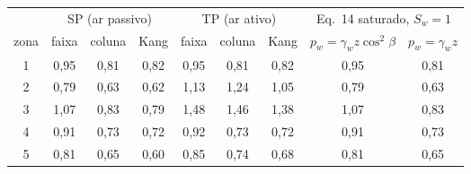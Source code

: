 \begin{tabular}{c|ccc|ccc|cc}
\toprule
 & \multicolumn{3}{c|}{SP (ar passivo)} & \multicolumn{3}{c|}{TP (ar ativo)} & \multicolumn{2}{c}{Eq.~14 saturado, $S_w = 1$}\\
zona & faixa & coluna & Kang & faixa & coluna & Kang & $p_w = \gamma_w z\cos^2\beta$ & $p_w = \gamma_w z$\\
\midrule
1 & 0{,}95 & 0{,}81 & 0{,}82 & 0{,}95 & 0{,}81 & 0{,}82 & 0{,}95 & 0{,}81 \\
2 & 0{,}79 & 0{,}63 & 0{,}62 & 1{,}13 & 1{,}24 & 1{,}05 & 0{,}79 & 0{,}63 \\
3 & 1{,}07 & 0{,}83 & 0{,}79 & 1{,}48 & 1{,}46 & 1{,}38 & 1{,}07 & 0{,}83 \\
4 & 0{,}91 & 0{,}73 & 0{,}72 & 0{,}92 & 0{,}73 & 0{,}72 & 0{,}91 & 0{,}73 \\
5 & 0{,}81 & 0{,}65 & 0{,}60 & 0{,}85 & 0{,}74 & 0{,}68 & 0{,}81 & 0{,}65 \\
\bottomrule
\end{tabular}
